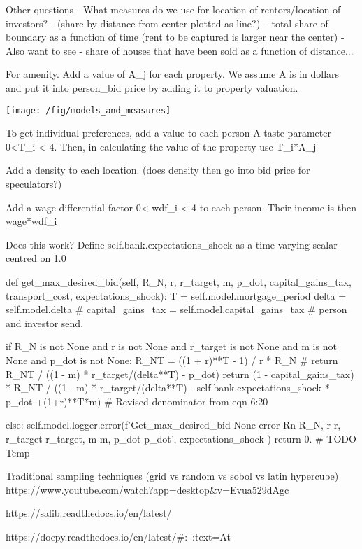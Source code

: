     
Other questions
- What measures do we use for location of rentors/location of investors? 
  - (share by distance from center plotted as line?) -- total share of boundary as a function of time (rent to be captured is larger near the center)
  - Also want to see - share of houses that have been sold as a function of distance... 



   

For amenity. Add a value of A_j for each property. We assume A is in dollars and put it into person_bid price by adding it to property valuation.

\texttt{[image: /fig/models\_and\_measures]}

To get individual preferences, add a value to each person A taste parameter 0<T_i < 4. Then, in calculating the value of the property use    T_i*A_j

Add a density to each location. (does density then go into bid price for speculators?) 

Add a wage differential factor 0< wdf_i < 4 to each person. Their income is then wage*wdf_i


Does this work?  Define self.bank.expectations_shock  as a time varying scalar centred on 1.0

    def get_max_desired_bid(self, R_N, r, r_target, m, p_dot, capital_gains_tax, transport_cost, expectations_shock):
        T      = self.model.mortgage_period
        delta  = self.model.delta
        # capital_gains_tax = self.model.capital_gains_tax # person and investor send.

        if R_N is not None and r is not None and r_target is not None and m is not None and p_dot is not None:
            R_NT   = ((1 + r)**T - 1) / r * R_N
            # return R_NT / ((1 - m) * r_target/(delta**T) - p_dot) 
            return (1 - capital_gains_tax) * R_NT / ((1 - m) * r_target/(delta**T) - self.bank.expectations_shock * p_dot +(1+r)**T*m) # Revised denominator from eqn 6:20

        else:
            self.model.logger.error(f'Get_max_desired_bid None error Rn {R_N}, r {r}, r_target {r_target}, m {m}, p_dot {p_dot}', expectations_shock
)
            return 0. # TODO Temp


Traditional sampling techniques (grid vs random vs sobol vs latin hypercube)
https://www.youtube.com/watch?app=desktop&v=Evua529dAgc


https://salib.readthedocs.io/en/latest/

https://doepy.readthedocs.io/en/latest/#:~:text=At%




